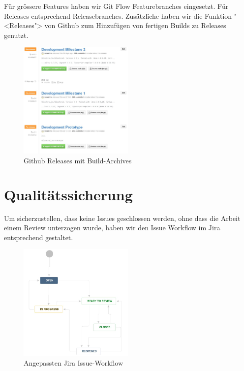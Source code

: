 		Für grössere Features haben wir Git Flow Featurebranches eingesetzt.
		Für Releases entsprechend Releasebranches.
		Zusätzliche haben wir die Funktion "<Releases"> von Github
		zum Hinzufügen von fertigen Builds zu Releases genutzt.
		
		\begin{figure}[H]
			\includegraphics[width=0.5\textwidth]{projectPlan/media/img/githubReleases.jpg}
			\centering
			\caption{Github Releases mit Build-Archives}
			\label{fig:githubReleases}
		\end{figure}
	
		
	\section{Qualitätssicherung}
		Um sicherzustellen, dass keine Issues geschlossen werden,
		ohne dass die Arbeit einem Review unterzogen wurde,
		haben wir den Issue Workflow im Jira entsprechend gestaltet.		
		
		\begin{figure}[H]
			\includegraphics[width=0.5\textwidth]{projectPlan/media/img/jiraIssueWorkflow.jpg}
			\centering
			\caption{Angepassten Jira Issue-Workflow}
			\label{fig:jiraIssueWorkflow}
		\end{figure}
		
